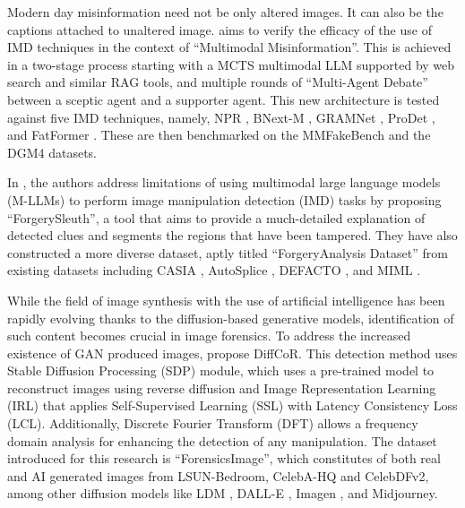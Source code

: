 
Modern day misinformation need not be only altered images. It can also be the
captions attached to unaltered image. \citet{sagar2026factfake} aims to verify
the efficacy of the use of IMD techniques in the context of “Multimodal
Misinformation”. This is achieved in a two-stage process starting with a MCTS
multimodal LLM supported by web search and similar RAG tools, and multiple
rounds of “Multi-Agent Debate” between a sceptic agent and a supporter agent.
This new architecture is tested against five IMD techniques, namely, NPR
\cite{tan2023npr}, BNext-M \cite{romeo2024bnextm}, GRAMNet
\cite{liu2020gramnet}, ProDet \cite{cheng2024prodet}, and
FatFormer \cite{liu2023fatformer}.
These are then benchmarked on the MMFakeBench and the DGM4 datasets.

In \citet{sun2025forgerysleuth}, the authors address limitations of using
multimodal large language models (M-LLMs) to perform image
manipulation detection (IMD) tasks by proposing “ForgerySleuth”, a
tool that aims to provide a much-detailed explanation of detected
clues and segments the regions that have been tampered. They have
also constructed a more diverse dataset, aptly titled
“ForgeryAnalysis Dataset” from existing datasets including CASIA
\cite{dong2013casia}, AutoSplice \cite{jia2023autosplice},
DEFACTO \cite{mahfoudi2019defacto}, and MIML \cite{qu2024miml}.

While the field of image synthesis with the use of artificial
intelligence has been rapidly evolving thanks to the diffusion-based
generative models, identification of such content becomes crucial in
image forensics. To address the increased existence of GAN produced
images, \citet{tran2025diffcor} propose DiffCoR. This detection
method uses Stable Diffusion Processing (SDP) module, which uses a
pre-trained model to reconstruct images using reverse diffusion and
Image Representation Learning (IRL) that applies Self-Supervised
Learning (SSL) with Latency Consistency Loss (LCL). Additionally,
Discrete Fourier Transform (DFT) allows a frequency domain analysis
for enhancing the detection of any manipulation. The dataset
introduced for this research is “ForensicsImage”, which constitutes
of both real and AI generated images from LSUN-Bedroom, CelebA-HQ and
CelebDFv2, among other diffusion models like LDM
\cite{rombach2022ldm}, DALL-E  \cite{ramesh2022dalle}, Imagen
\cite{saharia2022imagen}, and Midjourney.

